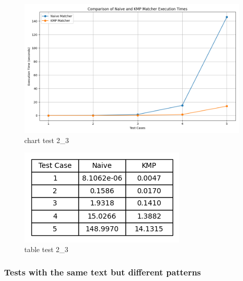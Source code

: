 \documentclass[11pt]{article}
\begin{document}
                \begin{figure}[H]
                    \centering
                    \includegraphics[width = \textwidth]{execution_times_2_3}
                    \caption{chart test 2\_3}
                    \label{fig:chart_test_2_3}
                \end{figure}

                \begin{figure}[H]
                    \centering
                    \includegraphics[width = 0.5 \textwidth]{table_execution_times_2_3}
                    \caption{table test 2\_3}
                    \label{fig:table_test_2_3}
                \end{figure}

            \newpage

            \subsubsection{Tests with the same text but different patterns} \label{subsubsec:tests_3}

\end{document}
